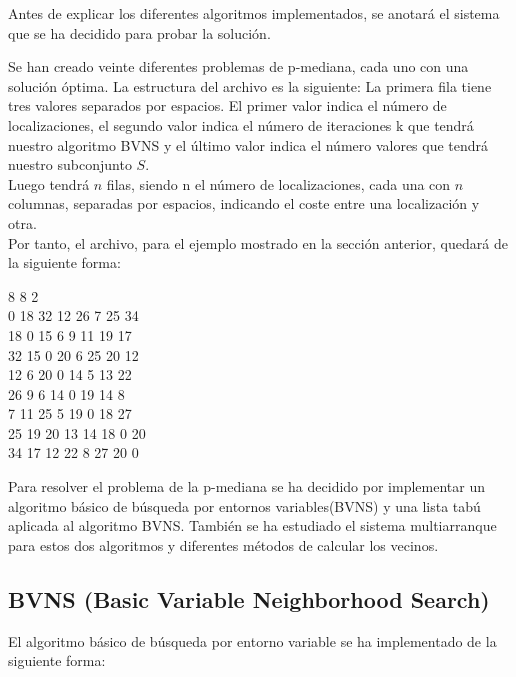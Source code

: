 
Antes de explicar los diferentes algoritmos implementados, se anotará el sistema que se ha decidido para probar la solución.

Se han creado veinte diferentes problemas de p-mediana, cada uno con una solución óptima. La estructura del archivo es la siguiente:
La primera fila tiene tres valores separados por espacios. 
El primer valor indica el número de localizaciones, 
el segundo valor indica el número de iteraciones k que tendrá nuestro algoritmo BVNS y 
el último valor indica el número valores que tendrá nuestro subconjunto $S$.\\

Luego tendrá $n$ filas, siendo n el número de localizaciones, cada una con $n$ columnas, separadas por espacios, indicando el coste entre una localización y otra.\\

Por tanto, el archivo, para el ejemplo mostrado en la sección anterior, quedará de la siguiente forma:
\begin{center}
\begin{tcolorbox}[colback=green!10,colframe=green!40!black,title=Fichero de ejemplo, center title, text width = 40mm]
		8 8 2\\
		0 18 32 12 26 7 25 34\\
		18 0 15 6 9 11 19 17\\
		32 15 0 20 6 25 20 12\\
		12 6 20 0 14 5 13 22\\
		26 9 6 14 0 19 14 8\\
		7 11 25 5 19 0 18 27\\
		25 19 20 13 14 18 0 20\\
		34 17 12 22 8 27 20 0
\end{tcolorbox}
\end{center}

Para resolver el problema de la p-mediana se ha decidido por implementar un algoritmo básico de búsqueda por entornos variables(BVNS) y una lista tabú aplicada al algoritmo BVNS. También se ha estudiado el sistema multiarranque para estos dos algoritmos y diferentes métodos de calcular los vecinos.\\

\subsection{BVNS (Basic Variable Neighborhood Search)}
El algoritmo básico de búsqueda por entorno variable se ha implementado de la siguiente forma: \\

